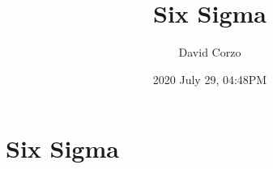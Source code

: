\documentclass[openany]{book}
\title{Six Sigma}
\date{2020 July 29, 04:48PM}
\author{David Corzo} %
\begin{document}
\maketitle
\tableofcontents

\chapter{Six Sigma}



\end{document}
